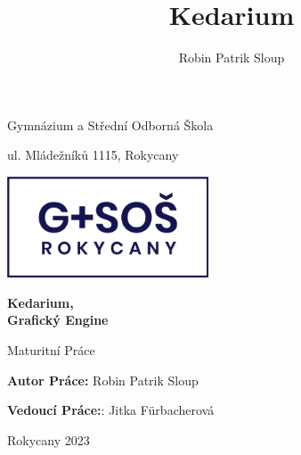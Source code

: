 \documentclass[11pt]{article}
\title{Kedarium}
\author{Robin Patrik Sloup}
\begin{document}
\begin{titlepage}
	\begin{center}
		{\Large Gymnázium a Střední Odborná Škola\par}
		\vspace{0.2cm}
		ul. Mládežníků 1115, Rokycany
	\end{center}
	\thispagestyle{empty}
	\begin{center}
		\vspace{1cm}
		\includegraphics[height=3cm]{school-logo.png}\\
	\end{center}
	\vspace*{\fill}
	\begin{center}
		{\Huge \textbf{Kedarium,\\Grafický Engine}\par}
		\vspace{0.3cm}
		{\Large Maturitní Práce\par}
		\vspace{1.5cm}
	\end{center}
	\vspace*{\fill}
	\begin{minipage}[t]{0.45\textwidth}
		\raggedright
		\textbf{Autor Práce:} Robin Patrik Sloup
	\end{minipage}%
	\begin{minipage}[t]{0.45\textwidth}
		\raggedleft
		\textbf{Vedoucí Práce:}: Jitka Fürbacherová
	\end{minipage}
	\vspace{2cm}
	\begin{center}
		Rokycany 2023
	\end{center}
\end{titlepage}
\end{document}
